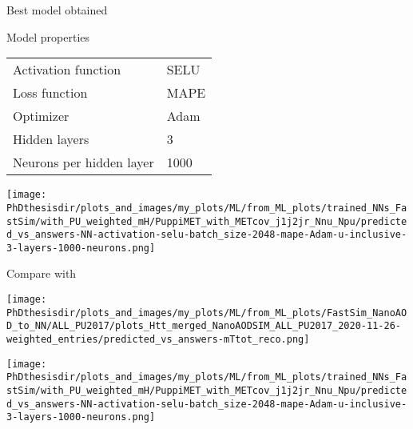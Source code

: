 \begin{frame}{Best model obtained}

\begin{minipage}[c]{.475\textwidth}
\begin{block}{Model properties}
\begin{center}
\begin{tabular}{ll}
Activation function & SELU\\
Loss function & MAPE\\
Optimizer & Adam\\
Hidden layers & 3\\
Neurons per hidden layer & 1000
\end{tabular}
\end{center}
\end{block}
\end{minipage}
\hfill
\begin{minipage}[c]{.475\textwidth}
\begin{center}\vspace{-4pt}
\texttt{[image: \\PhDthesisdir/plots\_and\_images/my\_plots/ML/from\_ML\_plots/trained\_NNs\_FastSim/with\_PU\_weighted\_mH/PuppiMET\_with\_METcov\_j1j2jr\_Nnu\_Npu/predicted\_vs\_answers-NN-activation-selu-batch\_size-2048-mape-Adam-u-inclusive-3-layers-1000-neurons.png]}
\end{center}\vspace{-5pt}
\end{minipage}

\end{frame}

\addtocounter{framenumber}{-1}
\begin{frame}

\vspace{-5pt}
\manip Compare with \mTtot

\vspace{5pt}

\begin{minipage}[c]{.475\textwidth}
\begin{center}\vspace{-4pt}
\texttt{[image: \\PhDthesisdir/plots\_and\_images/my\_plots/ML/from\_ML\_plots/FastSim\_NanoAOD\_to\_NN/ALL\_PU2017/plots\_Htt\_merged\_NanoAODSIM\_ALL\_PU2017\_2020-11-26-weighted\_entries/predicted\_vs\_answers-mTtot\_reco.png]}
\end{center}\vspace{-5pt}
\end{minipage}
\hfill
\begin{minipage}[c]{.475\textwidth}
\begin{center}\vspace{-4pt}
\texttt{[image: \\PhDthesisdir/plots\_and\_images/my\_plots/ML/from\_ML\_plots/trained\_NNs\_FastSim/with\_PU\_weighted\_mH/PuppiMET\_with\_METcov\_j1j2jr\_Nnu\_Npu/predicted\_vs\_answers-NN-activation-selu-batch\_size-2048-mape-Adam-u-inclusive-3-layers-1000-neurons.png]}
\end{center}\vspace{-5pt}
\end{minipage}

\end{frame}


